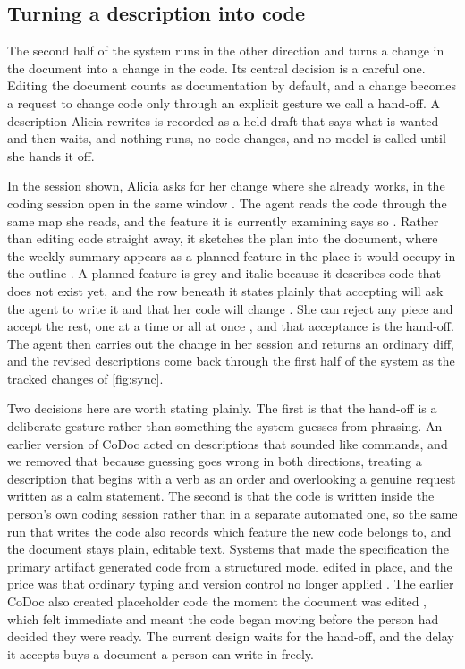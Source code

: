 \subsection{Turning a description into code}

The second half of the system runs in the other direction and turns a change in the document into a change in the code.
Its central decision is a careful one.
Editing the document counts as documentation by default, and a change becomes a request to change code only through an explicit gesture we call a hand-off.
A description Alicia rewrites is recorded as a held draft that says what is wanted and then waits, and nothing runs, no code changes, and no model is called until she hands it off.

In the session shown, Alicia asks for her change where she already works, in the coding session open in the same window .
The agent reads the code through the same map she reads, and the feature it is currently examining says so .
Rather than editing code straight away, it sketches the plan into the document, where the weekly summary appears as a planned feature in the place it would occupy in the outline .
A planned feature is grey and italic because it describes code that does not exist yet, and the row beneath it states plainly that accepting will ask the agent to write it and that her code will change .
She can reject any piece and accept the rest, one at a time or all at once , and that acceptance is the hand-off.
The agent then carries out the change in her session and returns an ordinary diff, and the revised descriptions come back through the first half of the system as the tracked changes of \autoref{fig:sync}.

Two decisions here are worth stating plainly.
The first is that the hand-off is a deliberate gesture rather than something the system guesses from phrasing.
An earlier version of CoDoc acted on descriptions that sounded like commands, and we removed that because guessing goes wrong in both directions, treating a description that begins with a verb as an order and overlooking a genuine request written as a calm statement.
The second is that the code is written inside the person's own coding session rather than in a separate automated one, so the same run that writes the code also records which feature the new code belongs to, and the document stays plain, editable text.
Systems that made the specification the primary artifact generated code from a structured model edited in place, and the price was that ordinary typing and version control no longer applied \citep{simonyi2006, voelter2011}.
The earlier CoDoc also created placeholder code the moment the document was edited \citep{codoc-prior}, which felt immediate and meant the code began moving before the person had decided they were ready.
The current design waits for the hand-off, and the delay it accepts buys a document a person can write in freely.

